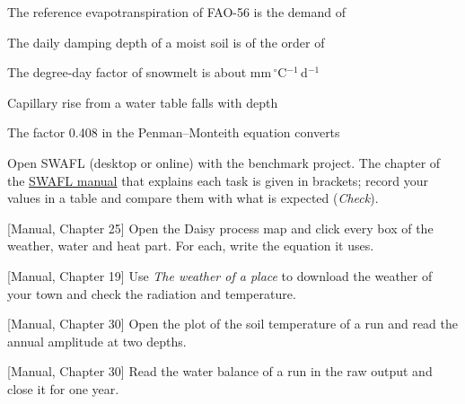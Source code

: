 \begin{exlist}
\item The reference evapotranspiration of FAO-56 is the demand of
\item The daily damping depth of a moist soil is of the order of
\item The degree-day factor of snowmelt is about mm\,$^\circ$C$^{-1}$\,d$^{-1}$
\item Capillary rise from a water table falls with depth
\item The factor 0.408 in the Penman--Monteith equation converts
\end{exlist}
{\small Open SWAFL (desktop or online) with the benchmark project. The chapter of the \href{https://github.com/halilunaziru73-creator/Coupled-Water-Fluxes-Pore-Scale-Dynamics-Precision-Irrigation-Mulching-Feedback-Loops/raw/main/Software/v1.1.0/SWAFL_Desktop/docs/manual_v1.1.0/SWAFL_Manual_v1.1.0.pdf}{SWAFL manual} that explains each task is given in brackets; record your values in a table and compare them with what is expected (\emph{Check}).}\par\vspace{3pt}
\begin{exlist}
\item {\color{khblue}[Manual, Chapter 25]} Open the Daisy process map and click every box of the weather, water and heat part. For each, write the equation it uses.\par{}
\item {\color{khblue}[Manual, Chapter 19]} Use \emph{The weather of a place} to download the weather of your town and check the radiation and temperature.\par{}
\item {\color{khblue}[Manual, Chapter 30]} Open the plot of the soil temperature of a run and read the annual amplitude at two depths.\par{}
\item {\color{khblue}[Manual, Chapter 30]} Read the water balance of a run in the raw output and close it for one year.\par{}
\end{exlist}
